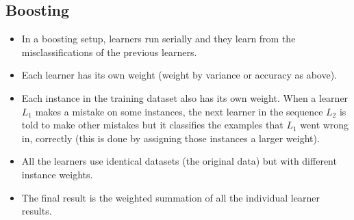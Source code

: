 \documentclass{article}
\theoremstyle{plain}
\theoremstyle{definition}
\begin{document}
\subsection{Boosting}
\begin{itemize}
    \item In a boosting setup, learners run serially and they learn from the misclassifications of the previous learners.
    
    \item Each learner has its own weight (weight by variance or accuracy as above). 
    
    \item Each instance in the training dataset also has its own weight. When a learner $L_1$ makes a mistake on some instances, the next learner in the sequence $L_2$ is told to make other mistakes but it classifies the examples that $L_1$ went wrong in, correctly (this is done by assigning those instances a larger weight). 
    
    \item All the learners use identical datasets (the original data) but with different instance weights. 
    
    \item The final result is the weighted summation of all the individual learner results. 
\end{itemize}
\end{document}
